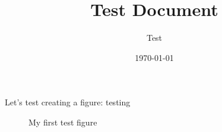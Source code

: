 \documentclass[a4paper]{article}
\begin{document}
\title{Test Document}
\author{Test}
\date{\today}
\maketitle

Let's test creating a figure: testing

\begin{figure}[H]
    \centering
    \caption{My first test figure}
\end{figure}
\end{document}
